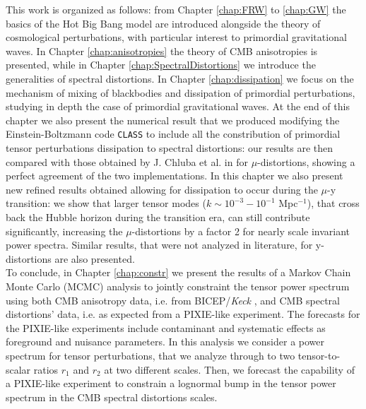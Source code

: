 This work is organized as follows: from Chapter \ref{chap:FRW} to \ref{chap:GW} the basics of the Hot Big Bang model are introduced alongside the theory of cosmological perturbations, with particular interest to primordial gravitational waves. In Chapter \ref{chap:anisotropies} the theory of CMB anisotropies is presented, while in Chapter \ref{chap:SpectralDistortions} we introduce the generalities of spectral distortions. In Chapter \ref{chap:dissipation} we focus on the mechanism of mixing of blackbodies and dissipation of primordial perturbations, studying in depth the case of primordial gravitational waves. At the end of this chapter we also present the numerical result that we produced modifying the Einstein-Boltzmann code \texttt{CLASS} \cite{CLASS} to include all the constribution of primordial tensor perturbations dissipation to spectral distortions: our results are then compared with those obtained by J. Chluba et al. in \cite{Chluba_tens_diss} for $\mu$-distortions, showing a perfect agreement of the two implementations. In this chapter we also present new refined results obtained allowing for dissipation to occur during the $\mu$-y transition: we show that larger tensor modes ($k\sim 10^{-3}-10^{-1}$ Mpc$^{-1}$), that cross back the Hubble horizon during the transition era, can still contribute significantly, increasing the $\mu$-distortions by a factor 2 for nearly scale invariant power spectra. Similar results, that were not analyzed in literature, for y-distortions are also presented.\\
To conclude, in Chapter \ref{chap:constr} we present the results of a Markov Chain Monte Carlo (MCMC) analysis to jointly constraint the tensor power spectrum using both CMB anisotropy data, i.e. from BICEP/\textit{Keck} \cite{Ade_2021}, and CMB spectral distortions' data, i.e. as expected from a PIXIE-like experiment. The forecasts for the PIXIE-like experiments include contaminant and systematic effects as foreground and nuisance parameters. In this analysis we consider a power spectrum for tensor perturbations, that we analyze through to two tensor-to-scalar ratios $r_1$ and $r_2$ at two different scales. Then, we forecast the capability of a PIXIE-like experiment to constrain a lognormal bump in the tensor power spectrum in the CMB spectral distortions scales.   